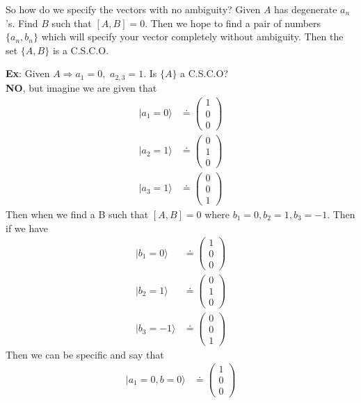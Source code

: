 \documentclass[a4paper, 11pt]{article}
\newcommand{\ket}[1]{|#1\rangle}
\newenvironment{solution}{%
	\begin{list}{}{%
			\setlength{\topsep}{0pt}%
			\setlength{\leftmargin}{1.5cm}%
			\setlength{\rightmargin}{1.5cm}%
			\setlength{\listparindent}{\parindent}%
			\setlength{\itemindent}{\parindent}%
			\setlength{\parsep}{\parskip}%
		}%
		\item[]}{\end{list}}
\begin{document}
	\noindent So how do we specify the vectors with no ambiguity? Given $A$ has degenerate $a_n$'s. Find $B$ such that $[A,B]=0$. Then we hope to find a pair of numbers $\{a_n, b_n\}$ which will specify your vector completely without ambiguity. Then the set $\{A, B\}$ is a C.S.C.O. 
		\begin{solution}
			\noindent\textbf{Ex}: Given $A \Rightarrow a_1 = 0,$ $a_{2,3} = 1$. Is $\{A\}$ a C.S.C.O? \\
			
			\noindent \textbf{NO}, but imagine we are given that 
				\begin{align*}
					\ket{a_1=0} &\doteq \begin{pmatrix}1 \\ 0 \\ 0 \end{pmatrix} \\
					\ket{a_2=1} &\doteq \begin{pmatrix}0 \\ 1 \\ 0 \end{pmatrix}\\
					\ket{a_3=1} &\doteq \begin{pmatrix}0 \\ 0 \\ 1 \end{pmatrix}
				\end{align*}
			Then when we find a B such that $[A,B]=0$ where $b_1 = 0, b_2=1, b_3=-1$. Then if we have 
				\begin{align*}
					\ket{b_1=0} &\doteq \begin{pmatrix}1 \\ 0 \\ 0 \end{pmatrix} \\
					\ket{b_2=1} &\doteq \begin{pmatrix}0 \\ 1 \\ 0 \end{pmatrix}\\
					\ket{b_3=-1} &\doteq \begin{pmatrix}0 \\ 0 \\ 1 \end{pmatrix}
				\end{align*}
			Then we can be specific and say that 
				\begin{align*}
				\ket{a_1=0, b=0} &\doteq \begin{pmatrix}1 \\ 0 \\ 0 \end{pmatrix} \\

\end{align*}
\end{solution}
\end{document}
